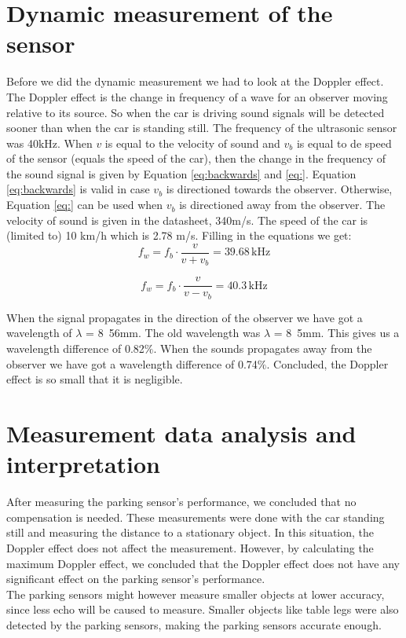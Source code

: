 \documentclass[final]{scrreprt} %
\begin{document}
\section{Dynamic measurement of the sensor}
Before we did the dynamic measurement we had to look at the Doppler effect. The Doppler effect is the change in frequency of a wave for an observer moving relative to its source. So when the car is driving sound signals will be detected sooner than when the car is standing still.
The frequency of the ultrasonic sensor was 40kHz. When $v$ is equal to the velocity of sound and $v_{b}$ is equal to de speed of the sensor (equals the speed of the car), then the change in the frequency of the sound signal is given by Equation \ref{eq:backwards} and \ref{eq:}. Equation \ref{eq:backwards} is valid in case $v_b$ is directioned towards the observer. Otherwise, Equation \ref{eq:} can be used when $v_b$ is directioned away from the observer. The velocity of sound is given in the datasheet, 340m/s. The speed of the car is (limited to) 10 km/h which is 2.78 m/s.
Filling in the equations we get: 
\begin{equation}
\label{eq:backwards}
f_{w} = f_{b} \cdot \frac{v}{v+v_{b}} = 39.68  \, \mathrm{kHz}
\end {equation}

\begin{equation}
\label{eq:}
f_{w} = f_{b} \cdot \frac{v}{v-v_{b}} = 40.3 \, \mathrm{kHz}
\end {equation}

When the signal propagates in the direction of the observer we have got a wavelength of $\lambda$ = \unit{8.56}mm. The old wavelength was $\lambda$ = \unit{8.5}mm. This gives us a wavelength difference of 0.82$\%$. When the sounds propagates away from the observer we have got a wavelength difference of 0.74$\%$. Concluded, the Doppler effect is so small that it is negligible.

\section{Measurement data analysis and interpretation}
After measuring the parking sensor's performance, we concluded that no compensation is needed. These measurements were done with the car standing still and measuring the distance to a stationary object. In this situation, the Doppler effect does not affect the measurement. However, by calculating the maximum Doppler effect, we concluded that the Doppler effect does not have any significant effect on the parking sensor's performance. \\
The parking sensors might however measure smaller objects at lower accuracy, since less echo will be caused to measure. Smaller objects like table legs were also detected by the parking sensors, making the parking sensors accurate enough.
\end{document}
